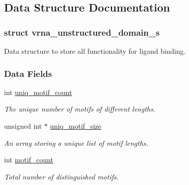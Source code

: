\subsection{Data Structure Documentation}
\label{structvrna__unstructured__domain__s}
\subsubsection{struct vrna\+\_\+unstructured\+\_\+domain\+\_\+s}
Data structure to store all functionality for ligand binding. \subsubsection*{Data Fields}
\begin{DoxyCompactItemize}
\item 
\mbox{\label{group__domains__up_ae17005ef8043aca2fc3864804cd5def6}} 
int \mbox{\hyperlink{group__domains__up_ae17005ef8043aca2fc3864804cd5def6}{uniq\+\_\+motif\+\_\+count}}
\begin{DoxyCompactList}\small\item\em The unique number of motifs of different lengths. \end{DoxyCompactList}\item 
\mbox{\label{group__domains__up_a2b484b0e19a47145db7055ada8b14159}} 
unsigned int $\ast$ \mbox{\hyperlink{group__domains__up_a2b484b0e19a47145db7055ada8b14159}{uniq\+\_\+motif\+\_\+size}}
\begin{DoxyCompactList}\small\item\em An array storing a unique list of motif lengths. \end{DoxyCompactList}\item 
\mbox{\label{group__domains__up_a5ad34148ea1d2e501f3e02029449546e}} 
int \mbox{\hyperlink{group__domains__up_a5ad34148ea1d2e501f3e02029449546e}{motif\+\_\+count}}
\begin{DoxyCompactList}\small\item\em Total number of distinguished motifs. \end{DoxyCompactList}\item 
\mbox{\label{group__domains__up_af285436bbdea4436ad2cedec65d48c75}} 

\end{DoxyCompactItemize}
